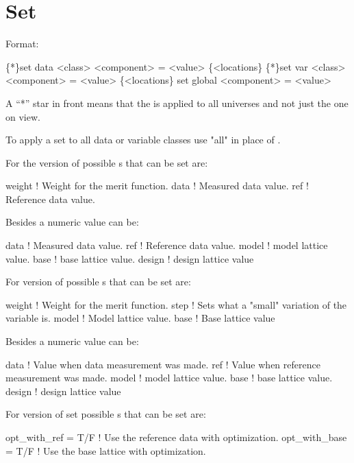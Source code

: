 \section{Set}
\label{s:set}

Format:
\begin{example}
  \{*\}set data <class> <component> = <value> \{<locations\}
  \{*\}set var <class> <component> = <value> \{<locations\}
  set global <component> = <value>
\end{example}

\vskip 0.2in
A ``*'' star in front means that the  is applied
to all universes and not just the one on view.

To apply a set to all data or variable classes use "all"
in place of .

For the  version of  possible 
s that can be set are:
\begin{example}
  weight      ! Weight for the merit function.
  data        ! Measured data value.
  ref         ! Reference data value.
\end{example}
Besides a numeric value  can be:
\begin{example}
  data        ! Measured data value.
  ref         ! Reference data value.
  model       ! model lattice value.
  base        ! base lattice value.
  design      ! design lattice value
\end{example}

For  version of  possible 
s that can be set are:
\begin{example}
  weight     ! Weight for the merit function.
  step       ! Sets what a "small" variation of the variable is.
  model      ! Model lattice value.
  base       ! Base lattice value
\end{example}
Besides a numeric value  can be:
\begin{example}
  data        ! Value when data measurement was made.
  ref         ! Value when reference measurement was made.
  model       ! model lattice value.
  base        ! base lattice value.
  design      ! design lattice value
\end{example}

For  version of set possible 
s that can be set are:
\begin{example}
  opt_with_ref  = T/F ! Use the reference data with optimization.
  opt_with_base = T/F ! Use the base lattice with optimization.
\end{example}

